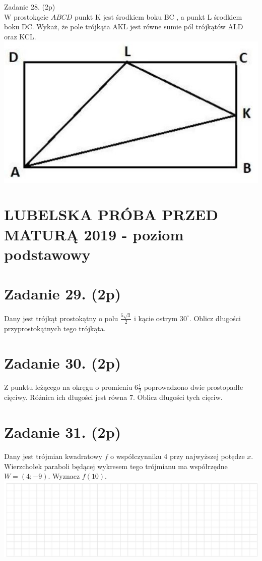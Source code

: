 \documentclass[10pt]{article}
\begin{document}
Zadanie 28. (2p)\\
W prostokącie \(A B C D\) punkt K jest środkiem boku BC , a punkt L środkiem boku DC. Wykaż, że pole trójkąta AKL jest równe sumie pól trójkątów ALD oraz KCL.\\
\includegraphics[max width=\textwidth, center]{2024_11_21_92d5a9232f32cac9f1a4g-09}

\section*{LUBELSKA PRÓBA PRZED MATURĄ 2019 - poziom podstawowy}
\section*{Zadanie 29. (2p)}
Dany jest trójkąt prostokątny o polu \(\frac{5 \sqrt{3}}{2}\) i kącie ostrym \(30^{\circ}\). Oblicz długości przyprostokątnych tego trójkąta.

\section*{Zadanie 30. (2p)}
Z punktu leżącego na okręgu o promieniu \(6 \frac{1}{2}\) poprowadzono dwie prostopadłe cięciwy. Różnica ich długości jest równa 7. Oblicz długości tych cięciw.

\section*{Zadanie 31. (2p)}
Dany jest trójmian kwadratowy \(f\) o współczynniku 4 przy najwyższej potędze \(x\). Wierzchołek paraboli będącej wykresem tego trójmianu ma współrzędne \(W=(4 ;-9)\). Wyznacz \(f(10)\).\\
\includegraphics[max width=\textwidth, center]{2024_11_21_92d5a9232f32cac9f1a4g-10}
\end{document}
